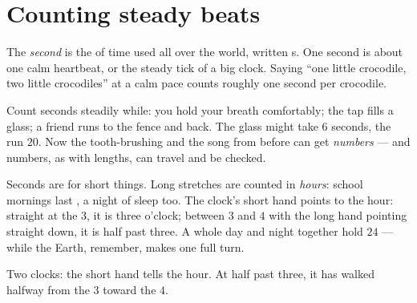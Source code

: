 \section{Counting steady beats}

\begin{definition}\label{def:g2:measuring-time:second}
The \emph{second} is the  of time used all over
the world, written \unit{s}. One second is about one calm heartbeat,
or the steady tick of a big clock. Saying ``one little crocodile,
two little crocodiles'' at a calm pace counts roughly one second per
crocodile.
\end{definition}

\begin{example}\label{ex:g2:measuring-time:count}
Count seconds steadily while: you hold your breath comfortably; the
tap fills a glass; a friend runs to the fence and back. The glass
might take $6$ seconds, the run $20$. Now the tooth-brushing and the
song from before can get \emph{numbers} --- and numbers, as with
lengths, can travel and be checked.
\end{example}

\begin{example}\label{ex:g2:measuring-time:clock}
Seconds are for short things. Long stretches are counted in
\emph{hours}: school mornings last , a night of
sleep too. The clock's short hand points to the hour: straight at
the $3$, it is three o'clock; between $3$ and $4$ with the long hand
pointing straight down, it is half past three. A whole day and night
together hold $24$  --- while the Earth, remember, makes one
full turn.
\end{example}

\begin{omfigure}

{\small Two clocks: the short hand tells the hour. At half past
three, it has walked halfway from the $3$ toward the $4$.}
\end{omfigure}

